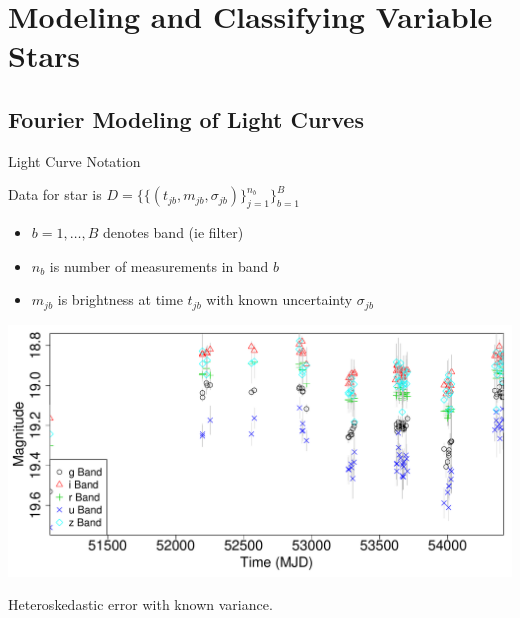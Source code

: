 \documentclass[12pt]{beamer}
\begin{document}
\section{Modeling and Classifying Variable Stars}

\subsection{Fourier Modeling of Light Curves}

\begin{frame}{Light Curve Notation}

  Data for star is $D=\{\{(t_{jb},m_{jb},\sigma_{jb})\}_{j=1}^{n_b}\}_{b=1}^B$
\begin{itemize}
\item $b=1,\ldots,B$ denotes band (ie filter)
\item $n_b$ is number of measurements in band $b$
\item $m_{jb}$ is brightness at time $t_{jb}$ with known uncertainty $\sigma_{jb}$
\end{itemize}

\begin{center}
\includegraphics[scale=0.3]{figs/unfolded_7904669.pdf}
\end{center}

\begin{center}
  Heteroskedastic error with known variance.
\end{center}

\end{frame}
\end{document}
